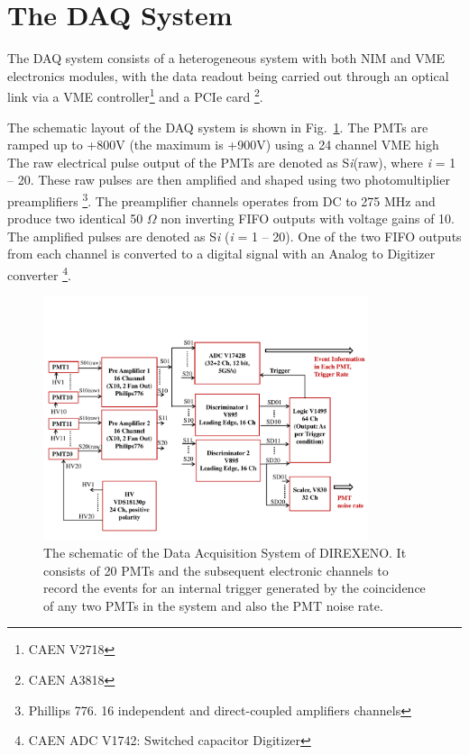 \section{The DAQ System }
\label{sec:DAQ}


The DAQ system consists of a heterogeneous system with both 
NIM and VME electronics modules, with the data readout being carried out 
through an optical link via a VME controller\footnote{CAEN V2718} and a 
PCIe card \footnote{CAEN A3818}. 

The schematic layout of the DAQ system is shown in Fig.~{\ref{Fig:DAQscheme}}. 
The PMTs are ramped up to +800V (the maximum is +900V) using a 24 channel VME high 
The raw electrical pulse output of the PMTs are denoted as S{\it i}(raw), where {\it i} = 1 -- 20. 
These raw pulses are then amplified and shaped using two photomultiplier preamplifiers 
\footnote{Phillips 776. 16 independent and direct-coupled amplifiers channels}. 
The preamplifier channels operates from DC to 275 MHz and produce two identical 
50 $\Omega$ non inverting FIFO outputs with voltage gains of 10. 
The amplified pulses are denoted as S{\it i} 
({\it i} = 1 -- 20). One of the two FIFO outputs from each channel is converted to a 
digital signal with an Analog to Digitizer converter \footnote{CAEN ADC V1742: Switched capacitor Digitizer}. 

\begin{figure}[h]
   \centering
   \includegraphics[width=0.85\textwidth]{DAQscheme.pdf}
   \caption{The schematic of the Data Acquisition System of DIREXENO. It 
        consists of 20 PMTs and the subsequent electronic channels to record 
        the events for an internal trigger generated by the coincidence of any 
        two PMTs in the system and also the PMT noise rate.}
   \label{Fig:DAQscheme}
\end{figure}

